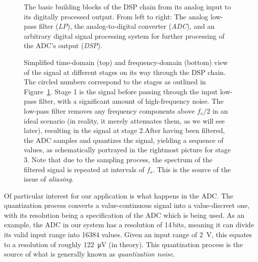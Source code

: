 \begin{figure}
    \centering
    
    \caption[The DSP Chain]{%
        The  basic  building   blocks  of  the  DSP  chain   from  its  analog
        input  to its  digitally processed  output.  From  left to  right: The
        analog  low-pass filter  (\emph{LP}), the  analog-to-digital converter
        (\emph{ADC}), and  an arbitrary  digital signal processing  system for
        further processing of the ADC's output (\emph{DSP}).%
    }
    \label{fig:dspChain:blocks}
\end{figure}

\begin{figure}
    \centering
    
    
    \caption[Signals Passing Through the DSP Chain (Simplified)]{%
        Simplified  time-domain  (top)   and  frequency-domain  (bottom)  view
        of  the  signal  at  different  stages on  its  way  through  the  DSP
        chain. The  circled  numbers  correspond  to the  stages  as  outlined
        in  Figure~\ref{fig:dspChain:blocks}.  Stage  1 is  the signal  before
        passing through the  input low-pass filter, with  a significant amount
        of  high-frequency noise. The  low-pass filter  removes any  frequency
        components  above ${f_s}/{2}$  in an  ideal scenario  (in reality,  it
        merely attenuates them, as we will see later), resulting in the signal
        at  stage  2.\protect\newline  After  having been  filtered,  the  ADC
        samples and  quantizes the signal,  yielding a sequence of  values, as
        schematically portrayed  in the rightmost  picture for stage  3.  Note
        that due to the sampling process,  the spectrum of the filtered signal
        is repeated at intervals of $f_s$. This  is the source of the issue of
        \emph{aliasing}.%
    }
    \label{fig:dspChain:signals}
\end{figure}

Of particular  interest for our  application is  what happens in  the ADC. The
quantization process converts a  value-continuous signal into a value-discreet
one,  with its  resolution being  a specification  of the  ADC which  is being
used. As an example, the ADC in our system has a resolution of \num{14}\,bits,
meaning it can divide its valid  input range into \num{16384} values. Given an
input  range of  \SI{2}{\volt_}, this  equates to  a resolution  of
roughly \SI{122}{\micro\volt}  (in theory). This  quantization process  is the
source of what is generally known as \emph{quantization noise}.

